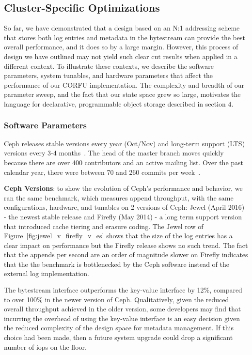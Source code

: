 \documentclass[10pt,twocolumn]{article}
\begin{document}
\subsection{Cluster-Specific Optimizations}

So far, we have demonstrated that a design based on an N:1 addressing scheme
that stores both log entries and metadata in the bytestream can provide the
best overall performance, and it does so by a large margin. However, this
process of design we have outlined may not yield such clear cut results when
applied in a different context. To illustrate these contexts, we describe the
software parameters, system tunables, and hardware parameters that affect the
performance of our CORFU implementation. The complexity and breadth of our
parameter sweep, and the fact that our state space grew so large, motivates the
language for declarative, programmable object storage described in section 4.

\subsubsection{Software Parameters}

Ceph releases stable versions every year (Oct/Nov) and long-term support (LTS)
versions every 3-4 months~\cite{website:ceph-releases}. The head of the master
branch moves quickly because there are over 400 contributors and an active
mailing list.  Over the past calendar year, there were between 70 and 260
commits per week~\cite{website:ceph-github}. 

\textbf{Ceph Versions}: to show the evolution of Ceph's performance and
behavior, we ran the same benchmark, which measures append throughput, with the
same configurations, hardware, and tunables on 2 versions of Ceph: Jewel (April
2016) - the newest stable release and Firefly (May 2014) - a long term support
version that introduced cache tiering and erasure coding. The Jewel row of 
Figure~\ref{fig:jewel_v_firefly_v_es} shows that the size of the log entries
has a clear impact on performance but the Firefly release shows no such trend.
The fact that the appends per second are an order of magnitude slower on
Firefly indicates that the the benchmark is bottlenecked by the Ceph software
instead of the external log implementation. 

The bytestream interface outperforms the key-value interface by 12\%, compared
to over 100\% in the newer version of Ceph. Qualitatively, given the reduced
overall throughput achieved in the older version, some developers may find that
incurring the overhead of using the key-value interface is an easy decision
given the reduced complexity of the design space for metadata management. If
this choice had been made, then a future system upgrade could drop a
significant number of iops on the floor.
\end{document}
